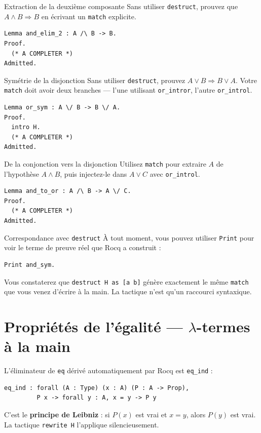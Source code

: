 \documentclass[11pt,a4paper]{article}
\begin{document}
\begin{exercice}{Extraction de la deuxième composante}{}
  Sans utiliser \texttt{destruct}, prouvez que $A \land B \Rightarrow B$ en écrivant un \texttt{match} explicite.

\begin{lstlisting}
Lemma and_elim_2 : A /\ B -> B.
Proof.
  (* A COMPLETER *)
Admitted.
\end{lstlisting}
\end{exercice}

\begin{exercice}{Symétrie de la disjonction}{}
  Sans utiliser \texttt{destruct}, prouvez $A \lor B \Rightarrow B \lor A$.
  Votre \texttt{match} doit avoir deux branches — l'une utilisant \texttt{or\_intror}, l'autre \texttt{or\_introl}.

\begin{lstlisting}
Lemma or_sym : A \/ B -> B \/ A.
Proof.
  intro H.
  (* A COMPLETER *)
Admitted.
\end{lstlisting}
\end{exercice}

\begin{exercice}{De la conjonction vers la disjonction}{}
  Utilisez \texttt{match} pour extraire $A$ de l'hypothèse $A \land B$, puis injectez-le dans $A \lor C$ avec \texttt{or\_introl}.

\begin{lstlisting}
Lemma and_to_or : A /\ B -> A \/ C.
Proof.
  (* A COMPLETER *)
Admitted.
\end{lstlisting}
\end{exercice}

\begin{remarque}{Correspondance avec \texttt{destruct}}{}
  À tout moment, vous pouvez utiliser \texttt{Print} pour voir le terme de preuve réel que Rocq a construit :
\begin{lstlisting}
Print and_sym.
\end{lstlisting}
  Vous constaterez que \texttt{destruct H as [a b]} génère exactement le même \texttt{match} que vous venez d'écrire à la main. La tactique n'est qu'un raccourci syntaxique.
\end{remarque}

\section{Propriétés de l'égalité — $\lambda$-termes à la main}

L'éliminateur de \texttt{eq} dérivé automatiquement par Rocq est \texttt{eq\_ind} :
\begin{lstlisting}
eq_ind : forall (A : Type) (x : A) (P : A -> Prop),
         P x -> forall y : A, x = y -> P y
\end{lstlisting}
C'est le \textbf{principe de Leibniz} : si $P(x)$ est vrai et $x = y$, alors $P(y)$ est vrai.
La tactique \texttt{rewrite~H} l'applique silencieusement.
\end{document}
